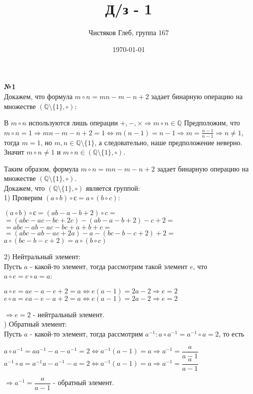 \documentclass[a4paper, 12pt]{article}
\title{Д/з - 1}
\author{Чистяков Глеб, группа 167}
\date{\today}
\begin{document}
	
	\maketitle
	
	\textbf{№1} \\
	
	Докажем, что формула $m \circ n = mn - m - n + 2$ задает бинарную операцию на множестве $(\mathbb{Q}\setminus\{1\}, \circ)$:
	
	В $m \circ n$ используются лишь операции $+, -, \times \Rightarrow m \circ n \in \mathbb{Q}$
	Предположим, что $m \circ n = 1 \Rightarrow mn - m - n + 2 = 1 \Leftrightarrow m(n - 1) = n - 1 \Rightarrow m = \frac{n - 1}{n - 1} \Rightarrow n \neq 1$, тогда $m = 1$, но $m, n \in \mathbb{Q}\setminus\{1\}$, а следовательно, наше предположение неверно. Значит $m \circ n \neq 1$ и $m \circ n \in (\mathbb{Q}\setminus\{1\}, \circ)$.
	
	Таким образом, формула $m \circ n = mn - m - n + 2$ задает бинарную операцию на множестве $(\mathbb{Q}\setminus\{1\}, \circ)$. \\
	
	Докажем, что $(\mathbb{Q}\setminus\{1\}, \circ)$ является группой: \\
	1) Проверим $(a \circ b) \circ с = a \circ (b \circ c)$:
	\begin{center}
		$(a \circ b) \circ с = (ab - a - b + 2) \circ c =$ \\
		$= (abc - ac - bc + 2c) - (ab - a - b + 2) - c + 2 =$ \\
		$= abc - ab - ac - bc + a + b + c =$ \\
		$= (abc - ab - ac + 2a) - a - (bc - b - c + 2) + 2 =$ \\
		$a \circ (bc - b - c + 2) = a \circ (b \circ c)$ \\
	\end{center}
	2) Нейтральный элемент: \\
 	Пусть $a$ - какой-то элемент, тогда рассмотрим такой элемент $e$, что $a \circ e = e \circ a = a$:
	\begin{center}
	$a \circ e = ae - a - e + 2 = a \Leftrightarrow e(a - 1) = 2a - 2 \Rightarrow e = 2$ \\
	$e \circ a = ea - e - a + 2 = a \Leftrightarrow e(a - 1) = 2a - 2 \Rightarrow e = 2$
	\end{center}
	$\Longrightarrow e = 2$ - нейтральный элемент. \\
	\newline
	\newline
	) Обратный элемент: \\
	Пусть $a$ - какой-то элемент, тогда рассмотрим $a^{-1}: a \circ a^{-1} = a^{-1} \circ a= 2$, то есть
	\begin{center}
		$a \circ a^{-1} = aa^{-1} - a - a^{-1} = 2 \Leftrightarrow a^{-1}(a - 1) = a \Rightarrow a^{-1} = \dfrac{a}{a - 1}$ \\
		$a^{-1} \circ a = a^{-1}a - a^{-1} - a = 2 \Leftrightarrow a^{-1}(a - 1) = a \Rightarrow a^{-1} = \dfrac{a}{a - 1}$ \\
	\end{center}
	$\Longrightarrow a^{-1} = \dfrac{a}{a - 1}$ - обратный элемент. \\
	
\end{document}
